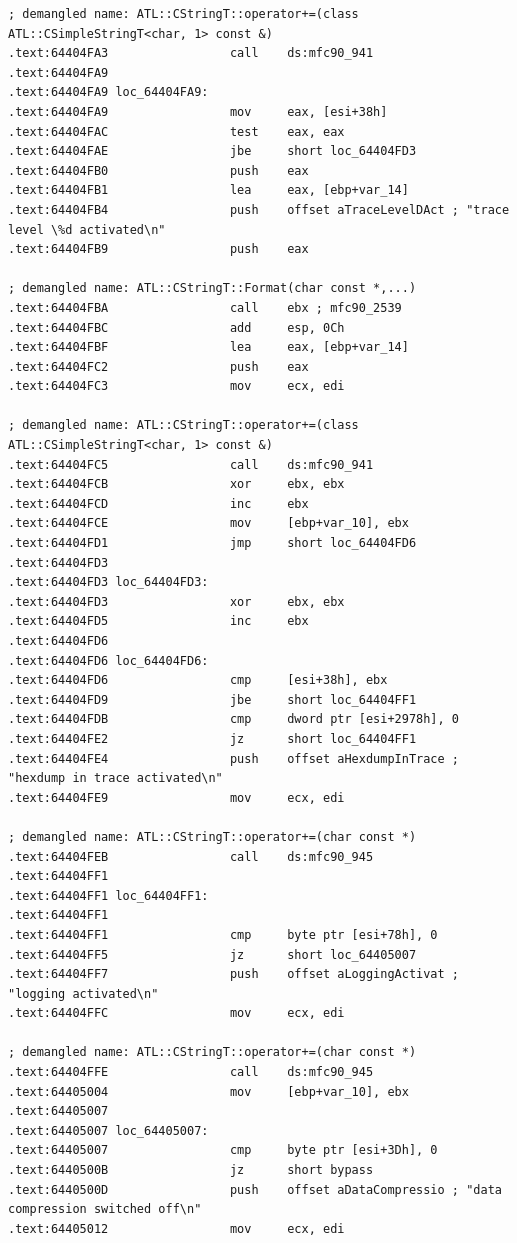 \begin{lstlisting}
; demangled name: ATL::CStringT::operator+=(class ATL::CSimpleStringT<char, 1> const &)
.text:64404FA3                 call    ds:mfc90_941
.text:64404FA9
.text:64404FA9 loc_64404FA9:
.text:64404FA9                 mov     eax, [esi+38h]
.text:64404FAC                 test    eax, eax
.text:64404FAE                 jbe     short loc_64404FD3
.text:64404FB0                 push    eax
.text:64404FB1                 lea     eax, [ebp+var_14]
.text:64404FB4                 push    offset aTraceLevelDAct ; "trace level \%d activated\n"
.text:64404FB9                 push    eax

; demangled name: ATL::CStringT::Format(char const *,...)
.text:64404FBA                 call    ebx ; mfc90_2539
.text:64404FBC                 add     esp, 0Ch
.text:64404FBF                 lea     eax, [ebp+var_14]
.text:64404FC2                 push    eax
.text:64404FC3                 mov     ecx, edi

; demangled name: ATL::CStringT::operator+=(class ATL::CSimpleStringT<char, 1> const &)
.text:64404FC5                 call    ds:mfc90_941
.text:64404FCB                 xor     ebx, ebx
.text:64404FCD                 inc     ebx
.text:64404FCE                 mov     [ebp+var_10], ebx
.text:64404FD1                 jmp     short loc_64404FD6
.text:64404FD3
.text:64404FD3 loc_64404FD3:
.text:64404FD3                 xor     ebx, ebx
.text:64404FD5                 inc     ebx
.text:64404FD6
.text:64404FD6 loc_64404FD6:
.text:64404FD6                 cmp     [esi+38h], ebx
.text:64404FD9                 jbe     short loc_64404FF1
.text:64404FDB                 cmp     dword ptr [esi+2978h], 0
.text:64404FE2                 jz      short loc_64404FF1
.text:64404FE4                 push    offset aHexdumpInTrace ; "hexdump in trace activated\n"
.text:64404FE9                 mov     ecx, edi

; demangled name: ATL::CStringT::operator+=(char const *)
.text:64404FEB                 call    ds:mfc90_945
.text:64404FF1
.text:64404FF1 loc_64404FF1:
.text:64404FF1
.text:64404FF1                 cmp     byte ptr [esi+78h], 0
.text:64404FF5                 jz      short loc_64405007
.text:64404FF7                 push    offset aLoggingActivat ; "logging activated\n"
.text:64404FFC                 mov     ecx, edi

; demangled name: ATL::CStringT::operator+=(char const *)
.text:64404FFE                 call    ds:mfc90_945
.text:64405004                 mov     [ebp+var_10], ebx
.text:64405007
.text:64405007 loc_64405007:
.text:64405007                 cmp     byte ptr [esi+3Dh], 0
.text:6440500B                 jz      short bypass
.text:6440500D                 push    offset aDataCompressio ; "data compression switched off\n"
.text:64405012                 mov     ecx, edi


\end{lstlisting}

